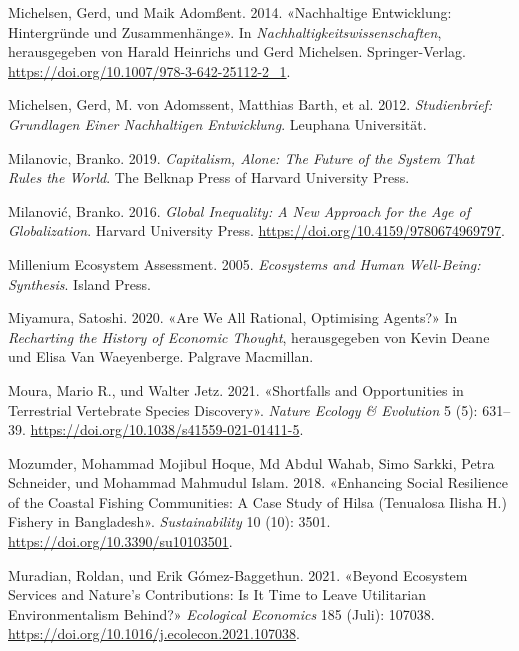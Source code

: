 \documentclass[
  nswissgerman,
  a4paper,
  DIV=11,
  numbers=noendperiod,
  oneside,
  openany]{scrreprt}
\newlength{\cslhangindent}
\newenvironment{CSLReferences}[2] %
 {\begin{list}{}{%
  \setlength{\itemindent}{0pt}
  \setlength{\leftmargin}{0pt}
  \setlength{\parsep}{0pt}
  \ifodd #1
   \setlength{\leftmargin}{\cslhangindent}
   \setlength{\itemindent}{-1\cslhangindent}
  \fi
  \setlength{\itemsep}{#2\baselineskip}}}
 {\end{list}}
\begin{document}
\begin{CSLReferences}{1}{1}
Michelsen, Gerd, und Maik Adomßent. 2014. {«{Nachhaltige Entwicklung:
Hintergr{ü}nde und Zusammenh{ä}nge}»}. In
\emph{{Nachhaltigkeitswissenschaften}}, herausgegeben von Harald
Heinrichs und Gerd Michelsen. Springer-Verlag.
\url{https://doi.org/10.1007/978-3-642-25112-2_1}.

{Michelsen, Gerd, M. von Adomssent, Matthias Barth, et al.} 2012.
\emph{Studienbrief: {Grundlagen} Einer Nachhaltigen {Entwicklung}}.
Leuphana Universität.

Milanovic, Branko. 2019. \emph{Capitalism, {Alone}: {The Future} of the
{System} That {Rules} the {World}}. The Belknap Press of Harvard
University Press.

Milanović, Branko. 2016. \emph{Global {Inequality}: {A New Approach} for
the {Age} of {Globalization}}. Harvard University Press.
\url{https://doi.org/10.4159/9780674969797}.

Millenium Ecosystem Assessment. 2005. \emph{Ecosystems and {Human
Well-Being}: {Synthesis}}. Island Press.

Miyamura, Satoshi. 2020. {«Are {We All Rational}, {Optimising Agents}?»}
In \emph{Recharting the {History} of {Economic Thought}}, herausgegeben
von Kevin Deane und Elisa Van Waeyenberge. Palgrave Macmillan.

Moura, Mario R., und Walter Jetz. 2021. {«Shortfalls and Opportunities
in Terrestrial Vertebrate Species Discovery»}. \emph{Nature Ecology \&
Evolution} 5 (5): 631--39.
\url{https://doi.org/10.1038/s41559-021-01411-5}.

Mozumder, Mohammad Mojibul Hoque, Md Abdul Wahab, Simo Sarkki, Petra
Schneider, und Mohammad Mahmudul Islam. 2018. {«Enhancing {Social
Resilience} of the {Coastal Fishing Communities}: {A Case Study} of
{Hilsa} ({Tenualosa Ilisha H}.) {Fishery} in {Bangladesh}»}.
\emph{Sustainability} 10 (10): 3501.
\url{https://doi.org/10.3390/su10103501}.

Muradian, Roldan, und Erik Gómez-Baggethun. 2021. {«Beyond Ecosystem
Services and Nature's Contributions: {Is} It Time to Leave Utilitarian
Environmentalism Behind?»} \emph{Ecological Economics} 185 (Juli):
107038. \url{https://doi.org/10.1016/j.ecolecon.2021.107038}.


\end{CSLReferences}
\end{document}
